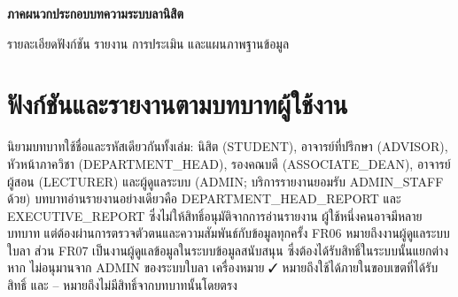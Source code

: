 \begin{center}\textbf{ภาคผนวกประกอบบทความระบบลานิสิต}\end{center}
รายละเอียดฟังก์ชัน รายงาน การประเมิน และแผนภาพฐานข้อมูล
\appendix
\renewcommand{\thesection}{\ifcase\value{section}\or ก\or ข\or ค\or ง\or จ\or ฉ\or ช\or ซ\fi}
\section{ฟังก์ชันและรายงานตามบทบาทผู้ใช้งาน}
นิยามบทบาทใช้ชื่อและรหัสเดียวกันทั้งเล่ม: นิสิต (STUDENT), อาจารย์ที่ปรึกษา (ADVISOR), หัวหน้าภาควิชา (DEPARTMENT\_HEAD), รองคณบดี (ASSOCIATE\_DEAN), อาจารย์ผู้สอน (LECTURER) และผู้ดูแลระบบ (ADMIN; บริการรายงานยอมรับ ADMIN\_STAFF ด้วย) บทบาทอ่านรายงานอย่างเดียวคือ DEPARTMENT\_HEAD\_REPORT และ EXECUTIVE\_REPORT ซึ่งไม่ให้สิทธิ์อนุมัติจากการอ่านรายงาน ผู้ใช้หนึ่งคนอาจมีหลายบทบาท แต่ต้องผ่านการตรวจตัวตนและความสัมพันธ์กับข้อมูลทุกครั้ง
FR06 หมายถึงงานผู้ดูแลระบบใบลา ส่วน FR07 เป็นงานผู้ดูแลข้อมูลในระบบข้อมูลสนับสนุน ซึ่งต้องได้รับสิทธิ์ในระบบนั้นแยกต่างหาก ไม่อนุมานจาก ADMIN ของระบบใบลา เครื่องหมาย {✓} หมายถึงใช้ได้ภายในขอบเขตที่ได้รับสิทธิ์ และ -- หมายถึงไม่มีสิทธิ์จากบทบาทนั้นโดยตรง
\begingroup
\setlength{\tabcolsep}{2pt}
\renewcommand{\arraystretch}{1.15}
